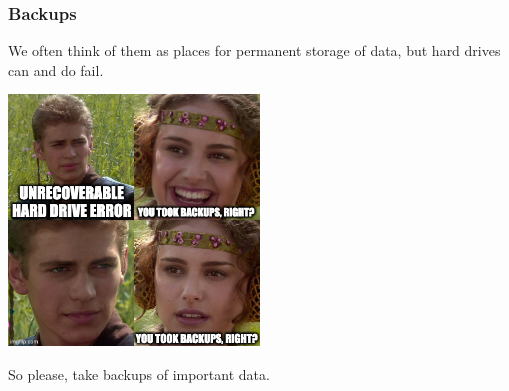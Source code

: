 \begin{frame}
\frametitle{Backups}

We often think of them as places for permanent storage of data, but hard drives can and do fail. 


\begin{center}
	\includegraphics[width=0.5\textwidth]{images/backups.jpg}
\end{center}

So please, take backups of important data.


\end{frame}



